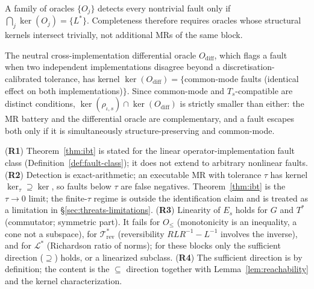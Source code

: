 \begin{corollary*}
A family of oracles $\{O_j\}$ detects every nontrivial fault only if
$\bigcap_j\ker(O_j)=\{L^{*}\}$. Completeness therefore requires oracles whose
structural kernels intersect trivially, not additional MRs of the same block.
\end{corollary*}

\begin{corollary*}
The neutral cross-implementation differential oracle $O_{\mathrm{diff}}$, which flags
a fault when two independent implementations disagree beyond a discretisation-
calibrated tolerance, has kernel $\ker(O_{\mathrm{diff}})=\{$common-mode faults
(identical effect on both implementations)$\}$. Since common-mode and
$T_s$-compatible are distinct conditions, $\ker(\rho_{\iota,s})\cap\ker(O_{\mathrm{diff}})$
is strictly smaller than either: the MR battery and the differential oracle are
complementary, and a fault escapes both only if it is simultaneously
structure-preserving and common-mode.
\end{corollary*}

\begin{remark}
\label{rem:ibt-scope}
(\textbf{R1}) Theorem~\ref{thm:ibt} is stated for the linear operator-implementation
fault class (Definition~\ref{def:fault-class}); it does not extend to arbitrary
nonlinear faults. (\textbf{R2}) Detection is exact-arithmetic; an executable MR with
tolerance $\tau$ has kernel $\ker_\tau\supseteq\ker$, so faults below $\tau$ are
false negatives. Theorem~\ref{thm:ibt} is the $\tau\to0$ limit; the finite-$\tau$
regime is outside the identification claim and is treated as a limitation in
\S\ref{sec:threats-limitations}.
(\textbf{R3}) Linearity of $E_s$ holds for $G$ and $T^{*}$ (commutator; symmetric
part). It fails for $O_\le$ (monotonicity is an inequality, a cone not a subspace),
for $\mathcal{T}^{*}_{\mathrm{rev}}$ (reversibility $R L R^{-1}-L^{-1}$ involves the inverse), and
for $\mathcal{L}^{*}$ (Richardson ratio of norms); for these blocks only the sufficient
direction ($\supseteq$) holds, or a linearized subclass. (\textbf{R4}) The sufficient
direction is by definition; the content is the $\subseteq$ direction together with
Lemma~\ref{lem:reachability} and the kernel characterization.
\end{remark}
